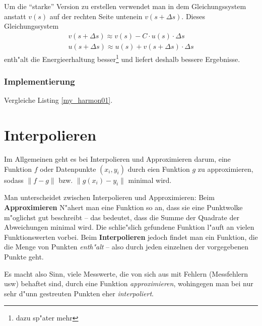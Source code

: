 \documentclass[a4paper]{book}
\begin{document}
Um die "`starke"' Version zu erstellen verwendet man in dem
Gleichungssystem anstatt $v(s)$ auf der rechten Seite untenein
$v(s+\Delta s)$. Dieses Gleichungssystem
\begin{equation}
\label{eq:17}
  \begin{aligned}
      v(s+\Delta s) \approx v(s) - C \cdot u(s) \cdot \Delta s \\
      u(s + \Delta s) \approx u(s) + v(s+\Delta s) \cdot \Delta s
  \end{aligned} 
\tag{1.27}
\end{equation}
enth"alt die Energieerhaltung besser\footnote{dazu sp"ater mehr} und
liefert deshalb bessere Ergebnisse.







\subsection{Implementierung}
\label{sec:implementierung}

Vergleiche Listing \ref{my_harmon01}.



 








\chapter{Interpolieren}
\label{sec:interpolieren}


Im Allgemeinen geht es bei Interpolieren und Approximieren darum, eine
Funktion $f$ oder Datenpunkte $(x_i, y_i)$ durch eien Funktion $g$ zu
approximieren, sodass $\|f-g\|$ bzw. $\|g(x_i) - y_i\|$ minimal wird.

Man unterscheidet zwischen {Interpolieren} und
{Approximieren}: Beim \textbf{Approximieren} N"ahert man eine
Funktion so an, dass sie eine Punktwolke m"oglichst gut beschreibt --
das bedeutet, dass die Summe der Quadrate der Abweichungen minimal
wird. Die schlie"slich gefundene Funktion l"auft an vielen
Funktionswerten vorbei. Beim \textbf{Interpolieren} jedoch findet man
ein Funktion, die die Menge von Punkten \emph{enth"alt} -- also durch
jeden einzelnen der vorgegebenen Punkte geht.

Es macht also Sinn, viele Messwerte, die von sich aus mit Fehlern
(Messfehlern usw) behaftet sind, durch eine Funktion
\emph{approximieren}, wohingegen man bei nur sehr d"unn gestreuten
Punkten eher \emph{interpoliert}.
\end{document}
